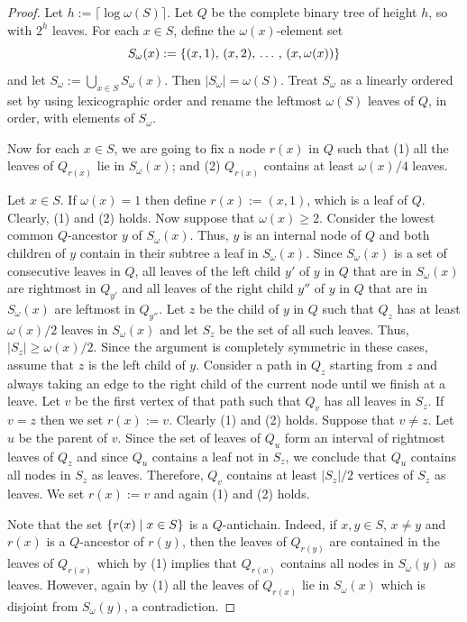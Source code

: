 \documentclass{patmorin}
\renewcommand{\geq}{\geqslant}
\DeclarePairedDelimiter{\set}{\{}{\}}
\begin{document}
   \begin{proof}
     Let $h:=\lceil\log\omega(S)\rceil$.
     Let $Q$ be the complete binary tree of height $h$, so with $2^h$ leaves.
     For each $x\in S$, define the $\omega(x)$-element set
     \[  S_{\omega}(x):=\set{(x,1),\,(x,2),\,\ldots\,,\,(x,\omega(x))}\]
     and let $S_\omega:=\bigcup_{x\in S}S_{\omega}(x)$.  Then $|S_\omega|=\omega(S)$.  Treat $S_{\omega}$ as a linearly ordered set by using lexicographic order and rename the leftmost $\omega(S)$ leaves of $Q$, in order, with elements of $S_{\omega}$.

    Now for each $x\in S$, we are going to fix a node $r(x)$ in $Q$ such that
    (1) all the leaves of $Q_{r(x)}$ lie in $S_{\omega}(x)$; and
    (2) $Q_{r(x)}$ contains at least $\omega(x)/4$ leaves.

     Let $x\in S$.
     If $\omega(x)=1$ then define $r(x):=(x,1)$, which is a leaf of $Q$.
     Clearly, (1) and (2) holds.
     Now suppose that $\omega(x)\geq2$.
     Consider the lowest common $Q$-ancestor $y$ of $S_{\omega}(x)$.
     Thus, $y$ is an internal node of $Q$ and
     both children of $y$ contain in their subtree a leaf in $S_{\omega}(x)$.
     Since $S_{\omega}(x)$ is a set of consecutive leaves in $Q$,
     all leaves of the left child $y'$ of $y$ in $Q$ that are in $S_{\omega}(x)$ are rightmost in $Q_{y'}$ and
     all leaves of the right child $y''$ of $y$ in $Q$ that are in $S_{\omega}(x)$ are leftmost in $Q_{y''}$.
     Let $z$ be the child of $y$ in $Q$ such that $Q_z$ has at least $\omega(x)/2$ leaves in $S_{\omega}(x)$ and let $S_z$ be the set of all such leaves.
     Thus, $|S_z|\geq \omega(x)/2$.
     Since the argument is completely symmetric in these cases, assume that $z$ is the left child of $y$.
     Consider a path in $Q_z$ starting from $z$ and always taking an edge to the right child of the current node until we finish at a leave.
     Let $v$ be the first vertex of that path such that $Q_v$ has all leaves in $S_z$.
     If $v=z$ then we set $r(x):=v$. Clearly (1) and (2) holds.
     Suppose that $v\neq z$.
     Let $u$ be the parent of $v$.
     Since the set of leaves of $Q_u$ form an interval of rightmost leaves of $Q_z$ and since $Q_u$ contains a leaf not in $S_z$, we conclude that $Q_u$ contains all nodes in $S_z$ as leaves.
     Therefore, $Q_v$ contains at least $|S_z|/2$ vertices of $S_z$ as leaves.
     We set $r(x):=v$ and again (1) and (2) holds.

     Note that the set $\set{r(x) \mid x\in S}$ is a $Q$-antichain.
     Indeed, if $x,y\in S$, $x\neq y$ and $r(x)$ is a $Q$-ancestor of  $r(y)$, then the leaves of $Q_{r(y)}$ are contained in the leaves of $Q_{r(x)}$ which by (1) implies that $Q_{r(x)}$ contains all nodes in $S_{\omega}(y)$ as leaves.
     However, again by (1) all the leaves of $Q_{r(x)}$ lie in $S_{\omega}(x)$ which is disjoint from $S_{\omega}(y)$, a contradiction.


\end{proof}
\end{document}

